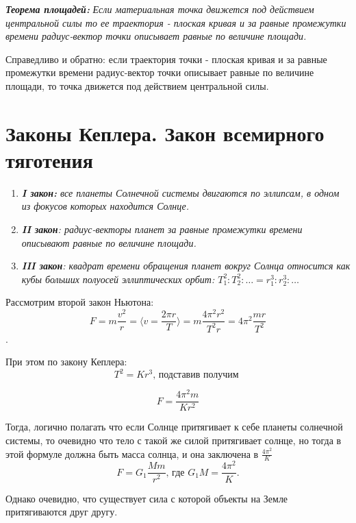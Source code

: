\documentclass[12pt,a4paper]{report}
\begin{document}
\vspace{5px}

\textbf{\textit{Теорема площадей:}} \textit{Если материальная точка движется под действием центральной силы то ее траектория - плоская кривая и за равные промежутки времени радиус-вектор точки описывает равные по величине площади.}

\vspace{4px}

Справедливо и обратно: если траектория точки - плоская кривая и за равные промежутки времени радиус-вектор точки описывает равные по величине площади, то точка движется под действием центральной силы.

\section{Законы Кеплера. Закон всемирного тяготения}

\begin{enumerate}
    \item \textit{\textbf{I закон:} все планеты Солнечной системы двигаются по эллипсам, в одном из фокусов которых находится Солнце.}
    \item \textit{\textbf{II закон}: радиус-векторы планет за равные промежутки времени описывают равные по величине площади.}
    \item \textit{\textbf{III закон}: квадрат времени обращения планет вокруг Солнца относится как кубы больших полуосей эллиптических орбит: $ T_1^2 : T_2^2 : \ldots = r_1^3 :r_2^3 : \ldots$}
\end{enumerate}

Рассмотрим второй закон Ньютона: \[ F = m\frac{v^2}{r} = \langle v = \frac{2 \pi r}{T} \rangle = m \frac{4\pi^2 r^2}{T^2 r} = 4\pi^2 \frac{mr}{T^2}\].

\vspace{5px}

При этом по закону Кеплера: \[ T^2  = Kr^3 \text{, подставив получим }\]

\[ F = \frac{4\pi^2m}{Kr^2}\]

\vspace{5px}

Тогда, логично полагать что если Солнце притягивает к себе планеты солнечной системы, то очевидно что тело с такой же силой притягивает солнце, но тогда в этой формуле должна быть масса солнца, и она заключена в $\frac{4\pi^2}{K}$
\[ F = G_1\frac{Mm}{r^2} \text{, где $G_1 M = \frac{4\pi^2}{K}$.}\]

Однако очевидно, что существует сила с которой объекты на Земле притягиваются друг другу.
\end{document}
